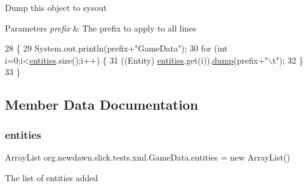 Dump this object to sysout


\begin{DoxyParams}{Parameters}
{\em prefix} & The prefix to apply to all lines \\
\hline
\end{DoxyParams}

\begin{DoxyCode}
28                                     \{
29         System.out.println(prefix+\textcolor{stringliteral}{"GameData"});
30         \textcolor{keywordflow}{for} (\textcolor{keywordtype}{int} i=0;i<\mbox{\hyperlink{namespaceentities}{entities}}.size();i++) \{
31             ((Entity) \mbox{\hyperlink{namespaceentities}{entities}}.get(i)).\mbox{\hyperlink{classorg_1_1newdawn_1_1slick_1_1tests_1_1xml_1_1_game_data_aa29ab866fa466f3558b2130fa4f11c3b}{dump}}(prefix+\textcolor{stringliteral}{"\(\backslash\)t"});
32         \}
33     \}
\end{DoxyCode}


\subsection{Member Data Documentation}
\mbox{\label{classorg_1_1newdawn_1_1slick_1_1tests_1_1xml_1_1_game_data_a4dd5056d57a4ebbc53014d0650d1247f}} 
\subsubsection{\texorpdfstring{entities}{entities}}
{\footnotesize\ttfamily Array\+List org.\+newdawn.\+slick.\+tests.\+xml.\+Game\+Data.\+entities = new Array\+List()\hspace{0.3cm}{\ttfamily [private]}}

The list of entities added 